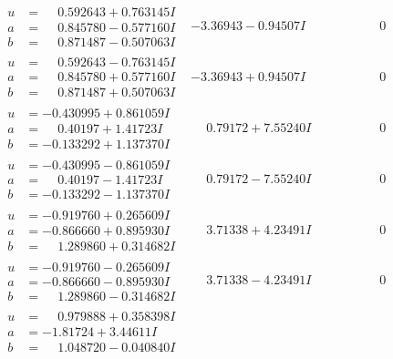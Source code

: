 \documentclass[1p]{elsarticle_modified}
\theoremstyle{definition}
\begin{document}
$$\begin{array}{c|c|c}
\begin{aligned}
u &= \phantom{-}0.592643 + 0.763145 I \\
a &= \phantom{-}0.845780 - 0.577160 I \\
b &= \phantom{-}0.871487 - 0.507063 I\end{aligned}
 & -3.36943 - 0.94507 I & \phantom{-0.000000 } 0 \\ \hline\begin{aligned}
u &= \phantom{-}0.592643 - 0.763145 I \\
a &= \phantom{-}0.845780 + 0.577160 I \\
b &= \phantom{-}0.871487 + 0.507063 I\end{aligned}
 & -3.36943 + 0.94507 I & \phantom{-0.000000 } 0 \\ \hline\begin{aligned}
u &= -0.430995 + 0.861059 I \\
a &= \phantom{-}0.40197 + 1.41723 I \\
b &= -0.133292 + 1.137370 I\end{aligned}
 & \phantom{-}0.79172 + 7.55240 I & \phantom{-0.000000 } 0 \\ \hline\begin{aligned}
u &= -0.430995 - 0.861059 I \\
a &= \phantom{-}0.40197 - 1.41723 I \\
b &= -0.133292 - 1.137370 I\end{aligned}
 & \phantom{-}0.79172 - 7.55240 I & \phantom{-0.000000 } 0 \\ \hline\begin{aligned}
u &= -0.919760 + 0.265609 I \\
a &= -0.866660 + 0.895930 I \\
b &= \phantom{-}1.289860 + 0.314682 I\end{aligned}
 & \phantom{-}3.71338 + 4.23491 I & \phantom{-0.000000 } 0 \\ \hline\begin{aligned}
u &= -0.919760 - 0.265609 I \\
a &= -0.866660 - 0.895930 I \\
b &= \phantom{-}1.289860 - 0.314682 I\end{aligned}
 & \phantom{-}3.71338 - 4.23491 I & \phantom{-0.000000 } 0 \\ \hline\begin{aligned}
u &= \phantom{-}0.979888 + 0.358398 I \\
a &= -1.81724 + 3.44611 I \\
b &= \phantom{-}1.048720 - 0.040840 I\end{aligned}

\end{array}$$
\end{document}
